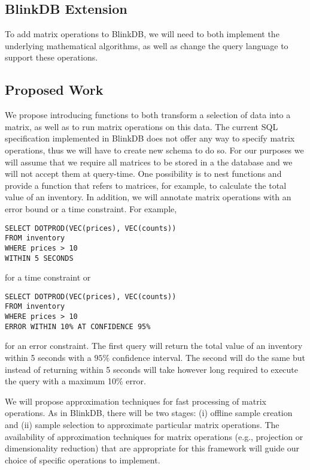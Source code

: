 \documentclass[twoside]{article}
\begin{document}
\begin{multicols}{2}
\section{BlinkDB Extension}
To add matrix operations to BlinkDB, we will need to both implement the underlying mathematical algorithms, as well as change the query language to support these operations. 
\subsection{Proposed Work}
We propose introducing functions to both transform a selection of data into a matrix, as well as to run matrix operations on this data. The current SQL specification implemented in BlinkDB does not offer any way to specify matrix operations, thus we will have to create new schema to do so. For our purposes we will assume that we require all matrices to be stored in a the database and we will not accept them at query-time. One possibility is to nest functions and provide a function that refers to matrices, for example, to calculate the total value of an inventory. In addition, we will annotate matrix operations with an error bound or a time constraint. For example,

\begin{verbatim}
SELECT DOTPROD(VEC(prices), VEC(counts))
FROM inventory
WHERE prices > 10
WITHIN 5 SECONDS
\end{verbatim}

\noindent for a time constraint or

\begin{verbatim}
SELECT DOTPROD(VEC(prices), VEC(counts))
FROM inventory
WHERE prices > 10
ERROR WITHIN 10% AT CONFIDENCE 95%
\end{verbatim}

\noindent for an error constraint. The first query will return the total value of an inventory within 5 seconds with a $95 \%$ confidence interval. The second will do the same but instead of returning within 5 seconds will take however long required to execute the query with a maximum 10\% error.

We will propose approximation techniques for fast processing of matrix operations. As in BlinkDB, there will be two stages: (i) offline sample creation and (ii) sample selection to approximate particular matrix operations. The availability of approximation techniques for matrix operations (e.g., projection or dimensionality reduction) that are appropriate for this framework will guide our choice of specific operations to implement. 


\end{multicols}
\end{document}
